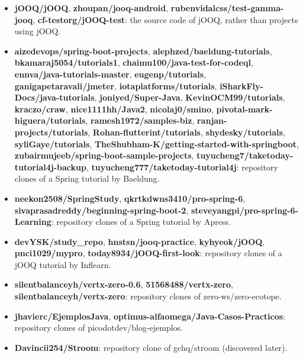 \begin{itemize}
    \item \textbf{jOOQ/jOOQ}, \textbf{zhoupan/jooq-android}, \textbf{rubenvidalcss/test-gamma-jooq}, \textbf{cf-testorg/jOOQ-test}: the source code of jOOQ, rather than projects using jOOQ.
    \item \textbf{aizedevops/spring-boot-projects}, \textbf{alephzed/baeldung-tutorials}, \textbf{bkamaraj5054/tutorials1}, \textbf{chaimu100/java-test-for-codeql}, \textbf{ennva/java-tutorials-master}, \textbf{eugenp/tutorials}, \textbf{ganigapetaravali/jmeter}, \textbf{iotaplatforms/tutorials}, \textbf{iSharkFly-Docs/java-tutorials}, \textbf{joniyed/Super-Java}, \textbf{KevinOCM99/tutorials}, \textbf{kraczo/craw}, \textbf{nice1111hh/Java2}, \textbf{nicolaj0/smino}, \textbf{pivotal-mark-higuera/tutorials}, \textbf{ramesh1972/samples-biz}, \textbf{ranjan-projects/tutorials}, \textbf{Rohan-flutterint/tutorials}, \textbf{shydesky/tutorials}, \textbf{syliGaye/tutorials}, \textbf{TheShubham-K/getting-started-with-springboot}, \textbf{zubairmujeeb/spring-boot-sample-projects}, \textbf{tuyucheng7/taketoday-tutorial4j-backup}, \textbf{tuyucheng777/taketoday-tutorial4j}: repository clones of a Spring tutorial by Baeldung.
    \item \textbf{neekon2508/SpringStudy}, \textbf{qkrtkdwns3410/pro-spring-6}, \textbf{sivaprasadreddy/beginning-spring-boot-2}, \textbf{steveyangpi/pro-spring-6-Learning}: repository clones of a Spring tutorial by Apress.
    \item \textbf{devYSK/study\_repo}, \textbf{hnstsn/jooq-practice}, \textbf{kyhyeok/jOOQ}, \textbf{pnci1029/mypro}, \textbf{today8934/jOOQ-first-look}: repository clones of a jOOQ tutorial by Inflearn.
    \item \textbf{silentbalanceyh/vertx-zero-0.6}, \textbf{51568488/vertx-zero}, \textbf{silentbalanceyh/vertx-zero}: repository clones of zero-ws/zero-ecotope.
    \item \textbf{jhavierc/EjemplosJava}, \textbf{optimus-alfaomega/Java-Casos-Practicos}: repository clones of picodotdev/blog-ejemplos.
    \item \textbf{Davincii254/Stroom}: repository clone of gchq/stroom (discovered later).
\end{itemize}
